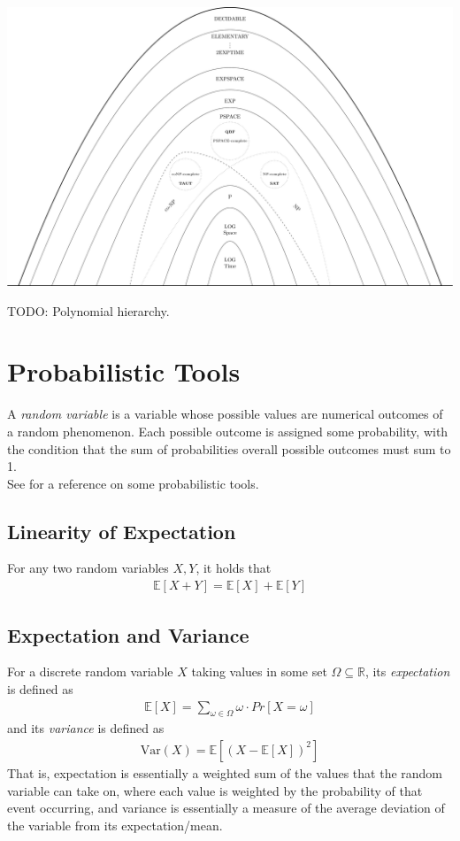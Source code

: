 \documentclass[10pt,a4paper]{article}
\begin{document}
\begin{center}
    \includegraphics[scale=0.11]{diagrams/complexity-classes.png} 
\end{center}

TODO: Polynomial hierarchy.


\newcommand{\expect}[1]{\mathbb{E}\left[#1\right]}
\newcommand{\var}[1]{\text{Var}(#1)}

\section{Probabilistic Tools}

A \textit{random variable} is a variable whose possible values are numerical outcomes of a random phenomenon. Each possible outcome is assigned some probability, with the condition that the sum of probabilities overall possible outcomes must sum to 1.\\See \cite{Doerr_2019} for a reference on some probabilistic tools.

\subsection*{Linearity of Expectation}
For any two random variables $X,Y$, it holds that
\begin{align*}
    \mathbb{E}[X + Y] =  \mathbb{E}[X] + \mathbb{E}[Y]
\end{align*}

\subsection*{Expectation and Variance}

For a discrete random variable $X$ taking values in some set $\Omega \subseteq \mathbb{R}$, its \textit{expectation} is defined as
\begin{align*}
    \expect{X} = \sum_{\omega \in \Omega} \omega \cdot Pr\left[X=\omega\right]
\end{align*}
and its \textit{variance} is defined as 
\begin{align*}
    \var{X} = \expect{(X - \expect{X})^2}
\end{align*}
That is, expectation is essentially a weighted sum of the values that the random variable can take on, where each value is weighted by the probability of that event occurring, and variance is essentially a measure of the average deviation of the variable from its expectation/mean.
\end{document}
